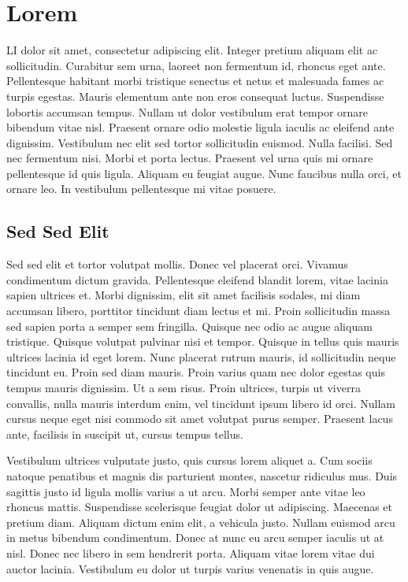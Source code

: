 \documentclass[final,los,index,glossary,loa]{ryethesis}
\begin{document}
\chapter{Lorem}
\Gls{LI} dolor sit amet, consectetur adipiscing elit. Integer pretium aliquam elit ac sollicitudin. Curabitur sem urna, laoreet non fermentum id, rhoncus eget ante. Pellentesque habitant morbi tristique senectus et netus et malesuada fames ac turpis egestas. Mauris elementum ante non eros consequat luctus. Suspendisse lobortis accumsan tempus. Nullam ut dolor vestibulum erat tempor ornare bibendum vitae nisl. Praesent ornare odio molestie ligula iaculis ac eleifend ante dignissim. Vestibulum nec elit sed tortor sollicitudin euismod. Nulla facilisi. Sed nec fermentum nisi. Morbi et porta lectus. Praesent vel urna quis mi ornare pellentesque id quis ligula. Aliquam eu feugiat augue. Nunc faucibus nulla orci, et ornare leo. In vestibulum pellentesque mi vitae posuere.

\section{Sed Sed Elit}
Sed sed elit et tortor volutpat mollis. Donec vel placerat orci. Vivamus condimentum dictum gravida. Pellentesque eleifend blandit lorem, vitae lacinia sapien ultrices et. Morbi dignissim, elit sit amet facilisis sodales, mi diam accumsan libero, porttitor tincidunt diam lectus et mi. Proin sollicitudin massa sed sapien porta a semper sem fringilla. Quisque nec odio ac augue aliquam tristique. Quisque volutpat pulvinar nisi et tempor. Quisque in tellus quis mauris ultrices lacinia id eget lorem. Nunc placerat rutrum mauris, id sollicitudin neque tincidunt eu. Proin sed diam mauris. Proin varius quam nec dolor egestas quis tempus mauris dignissim. Ut a sem risus. Proin ultrices, turpis ut viverra convallis, nulla mauris interdum enim, vel tincidunt ipsum libero id orci. Nullam cursus neque eget nisi commodo sit amet volutpat purus semper. Praesent lacus ante, facilisis in suscipit ut, cursus tempus tellus.

Vestibulum ultrices vulputate justo, quis cursus lorem aliquet a. Cum sociis natoque penatibus et magnis dis parturient montes, nascetur ridiculus mus. Duis sagittis justo id ligula mollis varius a ut arcu. Morbi semper ante vitae leo rhoncus mattis. Suspendisse scelerisque feugiat dolor ut adipiscing. Maecenas et pretium diam. Aliquam dictum enim elit, a vehicula justo. Nullam euismod arcu in metus bibendum condimentum. Donec at nunc eu arcu semper iaculis ut at nisl. Donec nec libero in sem hendrerit porta. Aliquam vitae lorem vitae dui auctor lacinia. Vestibulum eu dolor ut turpis varius venenatis in quis augue.
\end{document}
